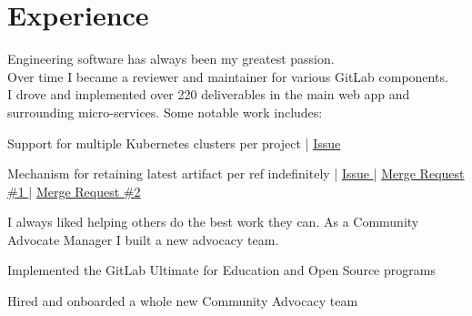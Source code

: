 \documentclass[]{matija-resume}
\begin{document}
\hfill
\begin{minipage}[t]{0.66\textwidth}


\section{Experience}
\vspace{\topsep}
Engineering software has always been my greatest passion.\\
\vspace{\topsep}
Over time I became a reviewer and maintainer for various GitLab components.\\
\vspace{\topsep}
I drove and implemented over 220 deliverables in the main web app and surrounding micro-services. Some notable work includes:
\vspace{\topsep}
\begin{tightemize}
\item Support for multiple Kubernetes clusters per project | \href{https://gitlab.com/gitlab-org/gitlab/-/issues/3734}{Issue }
\item Mechanism for retaining latest artifact per ref indefinitely | \href{https://gitlab.com/gitlab-org/gitlab/-/issues/16267}{Issue } | \href{https://gitlab.com/gitlab-org/gitlab/-/merge_requests/29802}{Merge Request \#1 } | \href{https://gitlab.com/gitlab-org/gitlab/-/merge_requests/30741}{Merge Request \#2 }
\end{tightemize}
\sectionsep

\vspace{\topsep}
I always liked helping others do the best work they can. As a Community Advocate Manager I built a new advocacy team.
\vspace{\topsep}
\begin{tightemize}
\item Implemented the GitLab Ultimate for Education and Open Source programs
\item Hired and onboarded a whole new Community Advocacy team
\end{tightemize}
\sectionsep


\end{minipage}
\end{document}
